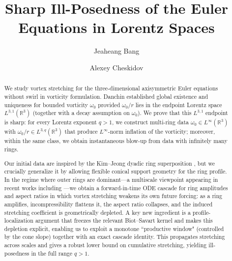 \documentclass[reqno,11pt]{amsart}
\begin{document}
\title{Sharp Ill-Posedness of the Euler Equations in Lorentz Spaces}

\begin{abstract}
We study vortex stretching for the three-dimensional axisymmetric Euler equations without swirl in vorticity formulation.
     Danchin \cite{Danchin07} established global existence and uniqueness for bounded vorticity $\omega_0$ provided $\omega_0/r$ lies in the endpoint Lorentz space $L^{3,1}(\mathbb{R}^3)$ (together with a decay assumption on $\omega_0$).
    We prove that this $L^{3,1}$ endpoint is sharp: for every Lorentz  exponent $q>1$, we construct multi-ring data $\omega_0 \in L^\infty (\mathbb{R}^3)$ with $\omega_0/r\in L^{3,q}(\mathbb{R}^3)$ that produce $L^\infty$-norm inflation of the vorticity; moreover, within the same class, we obtain instantaneous blow-up from data with infinitely many rings. 

    Our initial data are inspired by the Kim--Jeong dyadic ring superposition \cite{KimJeong22}, but we crucially generalize it by allowing flexible conical support geometry for the ring profile. In the regime where outer rings are dominant---a multiscale viewpoint appearing in recent works including \cite{KimJeong22,CordobaMartinezZheng25}---we obtain a forward-in-time ODE cascade for ring amplitudes and aspect ratios in which vortex stretching weakens its own future forcing: as a ring amplifies, incompressibility flattens it, the aspect ratio collapses, and the induced stretching coefficient is geometrically depleted. A key new ingredient is a profile-localization argument that freezes the relevant Biot–Savart kernel and makes this depletion explicit, enabling us to exploit a monotone ``productive window" (controlled by the cone slope) together with an exact cascade identity. This propagates stretching across scales and gives a robust lower bound on cumulative stretching, yielding ill-posedness in the full range $q>1$.    
\end{abstract}




\author{Jeaheang Bang}
\address{Institute for Theoretical Sciences, Westlake Institute for Advanced Study, Westlake University, 600 Dunyu Road, Hangzhou, Zhejiang 310024, People's Republic of China}

\author{Alexey Cheskidov}
\address{Institute for Theoretical Sciences, Westlake University, 600 Dunyu Road, Hangzhou, Zhejiang 310024, People's Republic of China}
\end{document}
